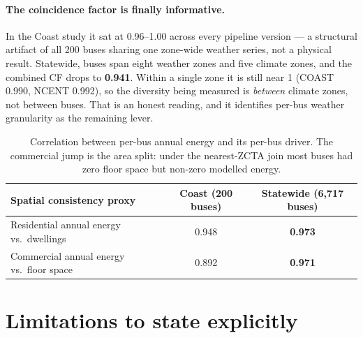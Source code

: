 \documentclass[11pt]{article}
\begin{document}
\paragraph{The coincidence factor is finally informative.} In the Coast study it sat at
0.96--1.00 across every pipeline version --- a structural artifact of all 200 buses sharing one
zone-wide weather series, not a physical result. Statewide, buses span eight weather zones and
five climate zones, and the combined CF drops to \textbf{0.941}. Within a single zone it is still
near 1 (COAST 0.990, NCENT 0.992), so the diversity being measured is \emph{between} climate
zones, not between buses. That is an honest reading, and it identifies per-bus weather
granularity as the remaining lever.

\begin{table}[H]
\centering\small
\begin{tabular}{lcc}
\toprule
Spatial consistency proxy & Coast (200 buses) & Statewide (6{,}717 buses) \\
\midrule
Residential annual energy vs.\ dwellings & 0.948 & \textbf{0.973} \\
Commercial annual energy vs.\ floor space & 0.892 & \textbf{0.971} \\
\bottomrule
\end{tabular}
\caption{Correlation between per-bus annual energy and its per-bus driver. The commercial jump
is the area split: under the nearest-ZCTA join most buses had zero floor space but non-zero
modelled energy.}
\label{tab:spatial}
\end{table}

\section{Limitations to state explicitly}
\label{sec:limits}
\end{document}
